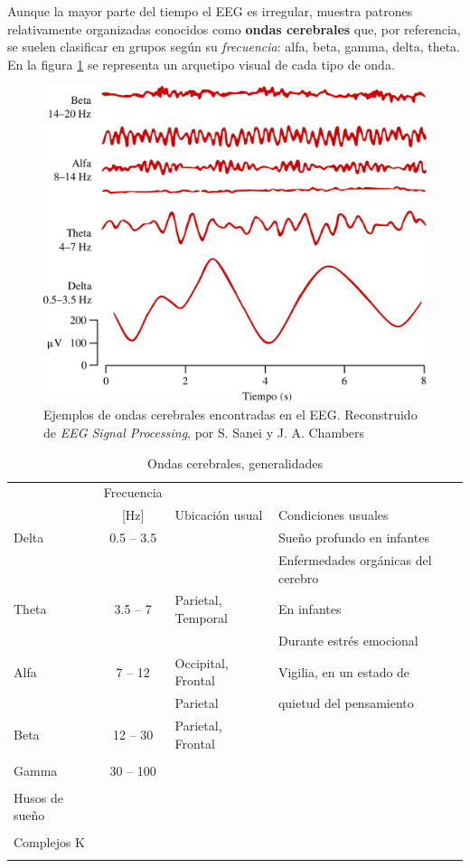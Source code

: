 Aunque la mayor parte del tiempo el EEG es irregular, muestra patrones relativamente organizadas 
conocidos como \textbf{ondas cerebrales} que, por referencia, se suelen clasificar en grupos 
según su \textit{frecuencia}: alfa, beta, gamma, delta, theta.
En la figura \ref{ritmos} se representa un arquetipo visual de cada tipo de onda.

\begin{figure}
\centering
\includegraphics[width=0.55\linewidth]{./img_diagramas/ritmos_hechos.pdf} 
\caption{Ejemplos de ondas cerebrales encontradas en el EEG. Reconstruido de \textit{EEG Signal 
Processing}, por S. Sanei y J. A. Chambers \cite{Sanei07} }
\label{ritmos}
\end{figure}

\begin{table}
\centering
\begin{tabular}{lclll}
\toprule
&{Frecuencia} && \\
&{[Hz]} & {Ubicación usual} & {Condiciones usuales} \\
\midrule
{Delta} & 0.5 -- 3.5 && Sueño profundo en infantes\\
&&& Enfermedades orgánicas del cerebro\\
{Theta} & 3.5 -- 7   & Parietal, Temporal & En infantes\\
&&& Durante estrés emocional \\
{Alfa}  & 7 -- 12    & Occipital, Frontal& Vigilia, en un estado de \\
&& Parietal & quietud del pensamiento\\
{Beta}  & 12 -- 30   &Parietal, Frontal&\\
&&& \\
{Gamma} & 30 -- 100  &&\\
&&& \\
\midrule
{Husos de sueño} &&&\\
&&& \\
{Complejos K} &&&\\
&&& \\
\bottomrule
\end{tabular}
\caption{Ondas cerebrales, generalidades}
\label{tabla_ondas}
\end{table}

